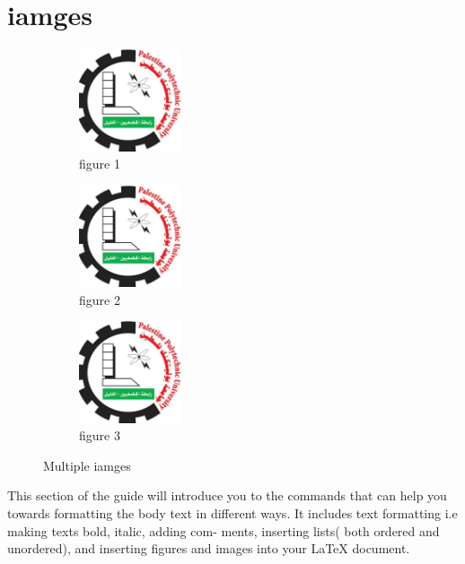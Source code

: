 \documentclass{article}
\begin{document}
\raggedright
\section{iamges}
\begin{figure}[h!]
\centering
\begin{subfigure}[b]{3cm}
\includegraphics[width=3cm]{mido.jpg}
\caption{figure 1}
\end{subfigure}
\begin{subfigure}[b]{3cm}
\includegraphics[width=3cm]{mido.jpg}
\caption{figure 2}
\end{subfigure}
\begin{subfigure}[b]{3cm}
\includegraphics[width=3cm]{mido.jpg}
\caption{figure 3}
\end{subfigure}
\caption{Multiple iamges}
\end{figure}

This section of the guide will introduce you to the commands that
can help you towards formatting the body text in different ways. It
includes text formatting i.e making texts bold, italic, adding com-
ments, inserting lists( both ordered and unordered), and inserting
figures and images into your LaTeX document.
\end{document}
